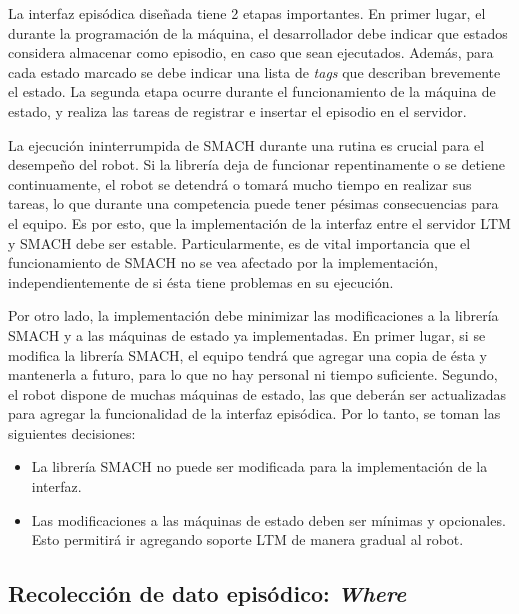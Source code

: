 La interfaz episódica diseñada tiene 2 etapas importantes. En primer lugar, el durante la programación de la máquina, el desarrollador debe indicar que estados considera almacenar como episodio, en caso que sean ejecutados. Además, para cada estado marcado se debe indicar una lista de \textit{tags} que describan brevemente el estado. La segunda etapa ocurre durante el funcionamiento de la máquina de estado, y realiza las tareas de registrar e insertar el episodio en el servidor.

La ejecución ininterrumpida de SMACH durante una rutina es crucial para el desempeño del robot. Si la librería deja de funcionar repentinamente o se detiene continuamente, el robot se detendrá o tomará mucho tiempo en realizar sus tareas, lo que durante una competencia puede tener pésimas consecuencias para el equipo. Es por esto, que la implementación de la interfaz entre el servidor LTM y SMACH debe ser estable. Particularmente, es de vital importancia que el funcionamiento de SMACH no se vea afectado por la implementación, independientemente de si ésta tiene problemas en su ejecución. 

Por otro lado, la implementación debe minimizar las modificaciones a la librería SMACH y a las máquinas de estado ya implementadas. En primer lugar, si se modifica la librería SMACH, el equipo tendrá que agregar una copia de ésta y mantenerla a futuro, para lo que no hay personal ni tiempo suficiente. Segundo, el robot dispone de muchas máquinas de estado, las que deberán ser actualizadas para agregar la funcionalidad de la interfaz episódica. Por lo tanto, se toman las siguientes decisiones:
\begin{itemize}
\item La librería SMACH no puede ser modificada para la implementación de la interfaz.
\item Las modificaciones a las máquinas de estado deben ser mínimas y opcionales. Esto permitirá ir agregando soporte LTM de manera gradual al robot.
\end{itemize}


\subsection{Recolección de dato episódico: \textit{Where}}

